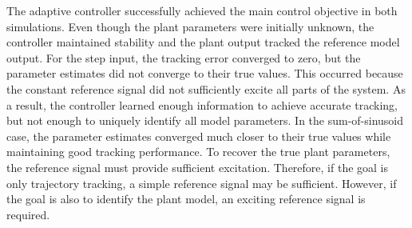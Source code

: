 The adaptive controller successfully achieved the main control objective in both simulations. Even though the plant parameters were initially unknown, the controller maintained stability and the plant output tracked the reference model output.
For the step input, the tracking error converged to zero, but the parameter estimates did not converge to their true values. This occurred because the constant reference signal did not sufficiently excite all parts of the system. As a result, the controller learned enough information to achieve accurate tracking, but not enough to uniquely identify all model parameters.
In the sum-of-sinusoid case, the parameter estimates converged much closer to their true values while maintaining good tracking performance.
To recover the true plant parameters, the reference signal must provide sufficient excitation. Therefore, if the goal is only trajectory tracking, a simple reference signal may be sufficient. However, if the goal is also to identify the plant model, an exciting reference signal is required.

\bigskip
